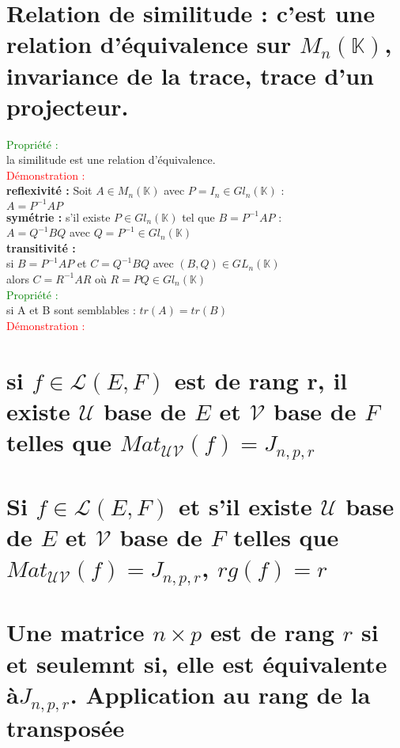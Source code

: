 \documentclass{article}
\begin{document}
        \section{Relation de similitude : c'est une relation d'équivalence sur $M_n( \mathbb K)$, invariance de la trace, trace d'un projecteur.}
				\textcolor{green}{Propriété :} \\
				la similitude est une relation d'équivalence. \\
				\textcolor{red}{Démonstration :} \\
				{\bf reflexivité :} Soit $A \in M_n(\mathbb K)$ avec $P=I_n \in Gl_n(\mathbb K)$ : \\
				$A=P^{-1}A P$ \\
				{\bf symétrie :} s'il existe $P \in Gl_n(\mathbb K)$ tel que $B=P^{-1}A P$ : \\
				 $A=Q^{-1}B Q$ avec $Q=P^{-1} \in Gl_n(\mathbb K)$ \\
				 {\bf transitivité :} \\
				 si $B=P^{-1}AP$ et $C=Q^{-1}BQ$ avec $(B,Q) \in GL_n(\mathbb K)$ \\
				 alors $C=R^{-1}AR$ où $R=PQ \in Gl_n(\mathbb K)$ \\
				 \textcolor{green}{Propriété :} \\
				  si A et B sont semblables : $tr(A)=tr(B)$ \\
				 \textcolor{red}{Démonstration :}
        \section{si $f \in \mathcal L(E,F)$ est de rang r, il existe $\mathcal U$ base de $E$ et $\mathcal V$ base de $F$ telles que $Mat_{\mathcal{UV}}(f)=J_{n,p,r}$}
        \section{Si $f \in \mathcal L(E,F)$ et s'il existe $\mathcal U$ base de $E$ et $\mathcal V$ base de $F$ telles que $Mat_{\mathcal{UV}}(f)=J_{n,p,r}$, $rg(f)=r$}
        \section{Une matrice $n \times p$ est de rang $r$ si et seulemnt si, elle est équivalente à$J_{n,p,r}$. Application au rang de la transposée}
\end{document}
